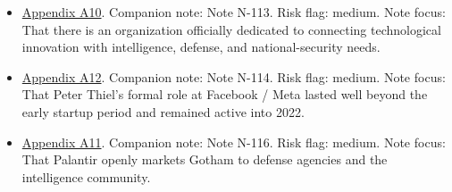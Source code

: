 \documentclass[
  american,
  11pt,
  letterpaper,
]{article}
\begin{document}
\begin{itemize}
{  A1}. Companion note: Note N-096. Risk flag: low. Note focus: That AI
  dominance was elevated to explicit state doctrine in 2025.
\item
  \hyperref[appendix-a10-in-q-tel]{Appendix A10}. Companion note: Note
  N-113. Risk flag: medium. Note focus: That there is an organization
  officially dedicated to connecting technological innovation with
  intelligence, defense, and national-security needs.
\item
  \hyperref[appendix-a12-meta-platforms-inc-2022-definitive-proxy-statement]{Appendix
  A12}. Companion note: Note N-114. Risk flag: medium. Note focus: That
  Peter Thiel's formal role at Facebook / Meta lasted well beyond the
  early startup period and remained active into 2022.
\item
  \hyperref[appendix-a11-gotham]{Appendix A11}. Companion note: Note
  N-116. Risk flag: medium. Note focus: That Palantir openly markets
  Gotham to defense agencies and the intelligence community.
\end{itemize}
\end{document}
